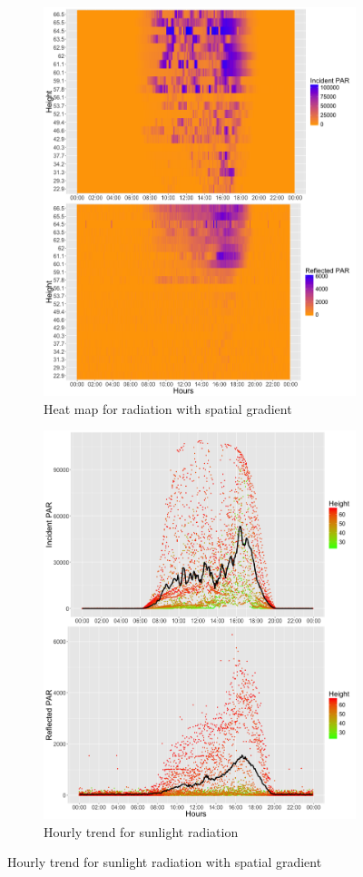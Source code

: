 \documentclass[11pt]{article}
\begin{document}
{\begin{figure}[H]
\begin{subfigure}{.5\textwidth}
\includegraphics [width=1\linewidth,height=1.1\linewidth]{find11.png}
\caption{Heat map for radiation with spatial gradient}
\label{fig:parrparheat}
\end{subfigure}%
\begin{subfigure}{.5\textwidth}
\centering
\includegraphics[width=1\linewidth,height=1.1\linewidth]{find12.png}
\caption{Hourly trend for sunlight radiation}
\label{fig:parrparpoint}
\end{subfigure}
\caption{Hourly trend for sunlight radiation with spatial gradient}
\end{figure}

}
\end{document}
